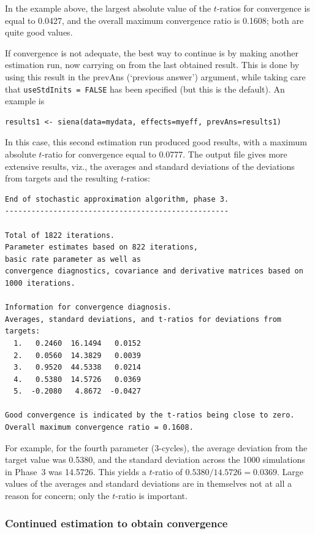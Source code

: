 \documentclass[a4paper,fleqn,11pt]{article}
\newcommand{\+}{\, + \,}
\begin{document}
In the example above, the largest absolute value of the $t$-ratios for convergence
is equal to 0.0427, and the overall maximum convergence ratio is 0.1608;
both are quite good values.

If convergence is not adequate, the best way to continue
is by making another estimation run,
now carrying on from the last obtained result. This is done by
using this result in the \textsf{prevAns} (`previous answer')
argument, while taking care that  \texttt{useStdInits = FALSE}
has been specified (but this is the default). An example is
\begin{verbatim}
results1 <- siena(data=mydata, effects=myeff, prevAns=results1)
\end{verbatim}
In this case, this second estimation run produced good results, with a
maximum absolute   $t$-ratio for convergence equal to 0.0777.
The output file gives more extensive results, viz.,
 the averages and standard deviations of the
deviations from targets and the resulting $t$-ratios:

{\footnotesize
\begin{verbatim}
End of stochastic approximation algorithm, phase 3.
---------------------------------------------------

Total of 1822 iterations.
Parameter estimates based on 822 iterations,
basic rate parameter as well as
convergence diagnostics, covariance and derivative matrices based on 1000 iterations.

Information for convergence diagnosis.
Averages, standard deviations, and t-ratios for deviations from targets:
  1.   0.2460  16.1494   0.0152
  2.   0.0560  14.3829   0.0039
  3.   0.9520  44.5338   0.0214
  4.   0.5380  14.5726   0.0369
  5.  -0.2080   4.8672  -0.0427

Good convergence is indicated by the t-ratios being close to zero.
Overall maximum convergence ratio = 0.1608.
\end{verbatim}
}
For example, for the fourth parameter (3-cycles), the average deviation
from the target value was 0.5380, and the standard deviation across the
1000 simulations in Phase~3 was  14.5726. This yields a $t$-ratio
of $ 0.5380 / 14.5726 = 0.0369$.
Large values of the averages and standard deviations are
in themselves not at all a reason for concern; only the
$t$-ratio is important.

\subsubsection{Continued estimation to obtain convergence}
\label{S_contconv}
\end{document}

